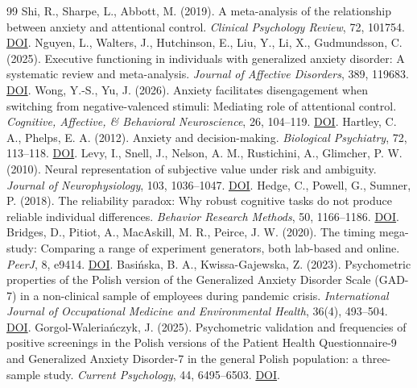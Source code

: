\documentclass[11pt,a4paper]{article}
\begin{document}
\begin{thebibliography}{99}
 Shi, R., Sharpe, L., Abbott, M. (2019). A meta-analysis of the relationship between anxiety and attentional control. \textit{Clinical Psychology Review}, 72, 101754. \href{https://doi.org/10.1016/j.cpr.2019.101754}{DOI}.
 Nguyen, L., Walters, J., Hutchinson, E., Liu, Y., Li, X., Gudmundsson, C. (2025). Executive functioning in individuals with generalized anxiety disorder: A systematic review and meta-analysis. \textit{Journal of Affective Disorders}, 389, 119683. \href{https://doi.org/10.1016/j.jad.2025.119683}{DOI}.
 Wong, Y.-S., Yu, J. (2026). Anxiety facilitates disengagement when switching from negative-valenced stimuli: Mediating role of attentional control. \textit{Cognitive, Affective, \& Behavioral Neuroscience}, 26, 104--119. \href{https://doi.org/10.3758/s13415-025-01349-2}{DOI}.
 Hartley, C. A., Phelps, E. A. (2012). Anxiety and decision-making. \textit{Biological Psychiatry}, 72, 113--118. \href{https://doi.org/10.1016/j.biopsych.2011.12.027}{DOI}.
 Levy, I., Snell, J., Nelson, A. M., Rustichini, A., Glimcher, P. W. (2010). Neural representation of subjective value under risk and ambiguity. \textit{Journal of Neurophysiology}, 103, 1036--1047. \href{https://doi.org/10.1152/jn.00853.2009}{DOI}.
 Hedge, C., Powell, G., Sumner, P. (2018). The reliability paradox: Why robust cognitive tasks do not produce reliable individual differences. \textit{Behavior Research Methods}, 50, 1166--1186. \href{https://doi.org/10.3758/s13428-017-0935-1}{DOI}.
 Bridges, D., Pitiot, A., MacAskill, M. R., Peirce, J. W. (2020). The timing mega-study: Comparing a range of experiment generators, both lab-based and online. \textit{PeerJ}, 8, e9414. \href{https://doi.org/10.7717/peerj.9414}{DOI}.
 Basińska, B. A., Kwissa-Gajewska, Z. (2023). Psychometric properties of the Polish version of the Generalized Anxiety Disorder Scale (GAD-7) in a non-clinical sample of employees during pandemic crisis. \textit{International Journal of Occupational Medicine and Environmental Health}, 36(4), 493--504. \href{https://doi.org/10.13075/ijomeh.1896.02104}{DOI}.
 Gorgol-Waleriańczyk, J. (2025). Psychometric validation and frequencies of positive screenings in the Polish versions of the Patient Health Questionnaire-9 and Generalized Anxiety Disorder-7 in the general Polish population: a three-sample study. \textit{Current Psychology}, 44, 6495--6503. \href{https://doi.org/10.1007/s12144-025-07646-w}{DOI}.
\end{thebibliography}
\end{document}
